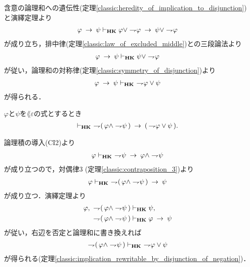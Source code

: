 	\begin{sketch}
		含意の論理和への遺伝性(定理\ref{classic:heredity_of_implication_to_disjunction})
		と演繹定理より
		\begin{align}
			\varphi \hspace{0.25em}\rightarrow\hspace{0.25em} \psi \vdash_{{\scriptsize \mbox{{\bf HK}}}}
			\varphi \vee \rightharpoondown\hspace{-0.25em} \varphi \hspace{0.25em}\rightarrow\hspace{0.25em} \psi \vee \rightharpoondown\hspace{-0.25em} \varphi
		\end{align}
		が成り立ち，排中律(定理\ref{classic:law_of_excluded_middle})との三段論法より
		\begin{align}
			\varphi \hspace{0.25em}\rightarrow\hspace{0.25em} \psi \vdash_{{\scriptsize \mbox{{\bf HK}}}}
			\psi \vee \rightharpoondown\hspace{-0.25em} \varphi
		\end{align}
		が従い，論理和の対称律(定理\ref{classic:symmetry_of_disjunction})より
		\begin{align}
			\varphi \rarrow \psi \provable{\mbox{{\bf HK}}}\ 
			\negation \varphi \vee \psi
		\end{align}
		が得られる．
		\QED
	\end{sketch}
	
	\begin{screen}
		\begin{thm}[De Morganの法則2]
		\label{classic:De_Morgan_law_2}
			$\varphi$と$\psi$を$\lang{\varepsilon}$の式とするとき
			\begin{align}
				\provable{\mbox{{\bf HK}}}\ 
				\negation (\, \varphi \wedge \negation \psi\, )
				\rarrow (\, \negation \varphi \vee \psi\, ).
			\end{align}
		\end{thm}
	\end{screen}
	
	\begin{sketch}
		論理積の導入(CI2)より
		\begin{align}
			\varphi \vdash_{{\scriptsize \mbox{{\bf HK}}}}\ \rightharpoondown\hspace{-0.25em} \psi
			\hspace{0.25em}\rightarrow\hspace{0.25em} \varphi \wedge \rightharpoondown\hspace{-0.25em} \psi
		\end{align}
		が成り立つので，対偶律3 (定理\ref{classic:contraposition_3})より
		\begin{align}
			\varphi \provable{\mbox{{\bf HK}}}\ 
			\negation (\, \varphi \wedge \negation \psi\, ) \rarrow \psi
		\end{align}
		が成り立つ．演繹定理より
		\begin{align}
			\varphi,\ \rightharpoondown\hspace{-0.25em} (\, \varphi \wedge \rightharpoondown\hspace{-0.25em} \psi\, ) 
			&\vdash_{{\scriptsize \mbox{{\bf HK}}}} \psi, \\
			\rightharpoondown\hspace{-0.25em} (\, \varphi \wedge \rightharpoondown\hspace{-0.25em} \psi\, ) 
			&\vdash_{{\scriptsize \mbox{{\bf HK}}}} \varphi \hspace{0.25em}\rightarrow\hspace{0.25em} \psi
		\end{align}
		が従い，右辺を否定と論理和に書き換えれば
		\begin{align}
			\rightharpoondown\hspace{-0.25em} (\, \varphi \wedge \rightharpoondown\hspace{-0.25em} \psi\, ) 
			\vdash_{{\scriptsize \mbox{{\bf HK}}}}\ \rightharpoondown\hspace{-0.25em} \varphi \vee \psi
		\end{align}
		が得られる(定理\ref{classic:implication_rewritable_by_disjunction_of_negation})．
		\QED
	\end{sketch}
	

